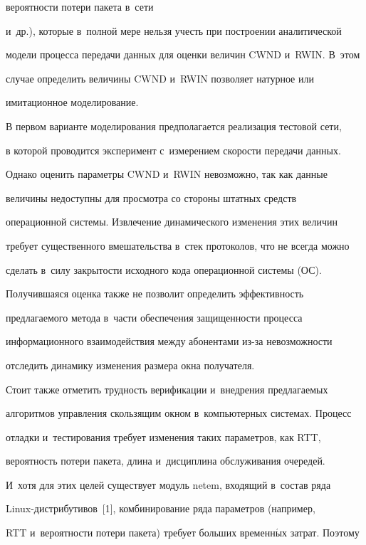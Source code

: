 вероятности потери пакета в~сети


и~др.), которые в~полной мере нельзя учесть при построении аналитической


модели процесса передачи данных для оценки величин CWND и~RWIN. В~этом


случае определить величины CWND и~RWIN позволяет натурное или


имитационное моделирование.





  В первом варианте моделирования предполагается реализация тестовой сети,


в которой проводится эксперимент с~измерением скорости передачи данных.


Однако оценить параметры CWND и~RWIN невозможно, так как данные


величины недоступны для просмотра со стороны штатных средств


операционной системы. Извлечение динамического изменения этих величин


требует существенного вмешательства в~стек протоколов, что не всегда можно


сделать в~силу закрытости исходного кода операционной системы (ОС).


Получившаяся оценка также не позволит определить эффективность


предлагаемого метода в~части обеспечения защищенности процесса


информационного взаимодействия между абонентами из-за невозможности


отследить динамику изменения размера окна получателя.





  Стоит также отметить трудность верификации и~внедрения предлагаемых


алгоритмов управления скользящим окном в~компьютерных системах. Процесс


отладки и~тестирования требует изменения таких параметров, как RTT,


вероятность потери пакета, длина и~дисциплина обслуживания очередей.


И~хотя для этих целей существует модуль netem, входящий в~состав ряда


Linux-дис\-три\-бу\-ти\-вов~[1], комбинирование ряда параметров (например,


RTT и~вероятности потери пакета) требует больших временн$\acute{\mbox{ы}}$х затрат. Поэтому


